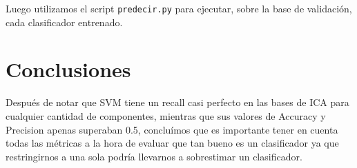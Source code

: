 \documentclass[10pt, a4paper]{article}
\begin{document}
Luego utilizamos el script \texttt{predecir.py} para ejecutar, sobre la base de validación, cada clasificador entrenado.

\section{Conclusiones}

Después de notar que SVM tiene un recall casi perfecto en las bases de ICA para cualquier cantidad de componentes,
mientras que sus valores de Accuracy y Precision apenas superaban 0.5, concluímos que es importante tener en cuenta todas las métricas a 
la hora de evaluar que tan bueno es un clasificador ya que restringirnos a una sola podría llevarnos a sobrestimar un clasificador.
\end{document}
